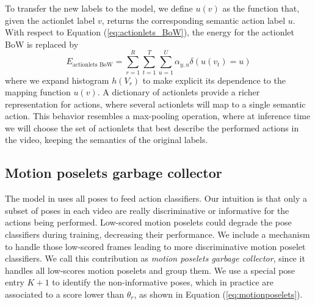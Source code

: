 To transfer the new labels to the model, we define $u(v)$ as the function that, 
given the actionlet label $v$, returns the corresponding semantic action 
label $u$. With respect to Equation (\ref{eq:actionlets_BoW}), the energy for 
the actionlet BoW is replaced by
\begin{equation}
E_{\text{actionlets BoW}} =  \sum_{r=1}^R\sum_{t=1}^T\sum_{u=1}^U \alpha_{y,u}\delta(u(v_t)=u)
\end{equation}  
where we expand histogram $h(V_r)$ to 
make explicit its dependence to the mapping function $u(v)$. A 
dictionary of actionlets provide a richer representation for actions, 
where several actionlets will map to a single semantic action. This 
behavior resembles a max-pooling operation, where at inference time we will 
choose the set of actionlets that best describe the performed actions in the 
video, keeping the semantics of the original labels. 

\subsection{Motion poselets garbage collector}
\label{subsec:garbage_collector}
The model in \cite{Lillo2014} uses all poses to feed action classifiers. Our 
intuition is that only a subset of poses in each video are really discriminative 
or informative for the actions being performed. Low-scored motion poselets 
could  degrade the pose classifiers during training, decreasing their 
performance. 
We include a mechanism to handle those low-scored 
frames leading to more discriminative motion poselet classifiers. 
We call this contribution as \emph{motion poselets garbage collector}, since it 
handles all low-scores motion poselets and group them. We use a special pose 
entry $K+1$ to identify the non-informative poses, which in practice are 
associated to a score lower than $\theta_r$, as shown in Equation 
(\ref{eq:motionposelets}).





 







